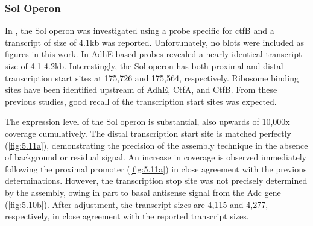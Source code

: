 \subsubsection{Sol Operon}
In \cite{65}, the Sol operon was investigated using a probe specific for ctfB and a transcript of size of 4.1kb was reported. Unfortunately, no blots were included as figures in this work. In \cite{63} AdhE-based probes revealed a nearly identical transcript size of 4.1-4.2kb. Interestingly, the Sol operon has both proximal and distal transcription start sites at 175,726 and 175,564, respectively\cite{62,63}. Ribosome binding sites have been identified upstream of AdhE, CtfA, and CtfB\cite{63}. From these previous studies, good recall of the transcription start sites was expected.

The expression level of the Sol operon is substantial, also upwards of 10,000x coverage cumulatively. The distal transcription start site is matched perfectly (\ref{fig:5.11a}), demonstrating the precision of the assembly technique in the absence of background or residual signal. An increase in coverage is observed immediately following the proximal promoter (\ref{fig:5.11a}) in close agreement with the previous determinations\cite{62,63}. However, the transcription stop site was not precisely determined by the assembly, owing in part to basal antisense signal from the Adc gene (\ref{fig:5.10b}). After adjustment, the transcript sizes are 4,115 and 4,277, respectively, in close agreement with the reported transcript sizes\cite{63,65}.

